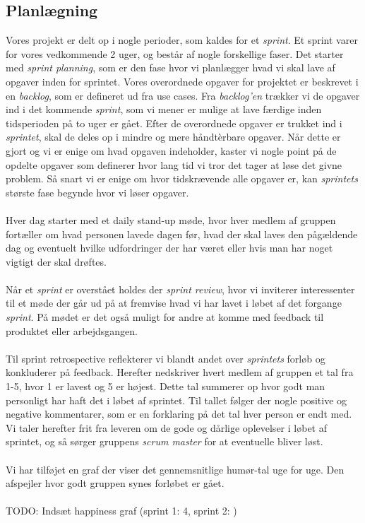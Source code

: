 \subsection{Planlægning}
Vores projekt er delt op i nogle perioder, som kaldes for et \textit{sprint}. Et sprint varer for vores vedkommende 2 uger, og består af nogle forskellige faser.
Det starter med \textit{sprint planning}, som er den fase hvor vi planlægger hvad vi skal lave af opgaver inden for sprintet. Vores overordnede opgaver for projektet er beskrevet i en \textit{backlog}, som er defineret ud fra use cases. Fra \textit{backlog'en} trækker vi de opgaver ind i det kommende \textit{sprint}, som vi mener er mulige at lave færdige inden tidsperioden på to uger er gået. Efter de overordnede opgaver er trukket ind i \textit{sprintet}, skal de deles op i mindre og mere håndtèrbare opgaver. Når dette er gjort og vi er enige om hvad opgaven indeholder, kaster vi nogle point på de opdelte opgaver som definerer hvor lang tid vi tror det tager at løse det givne problem. Så snart vi er enige om hvor tidskrævende alle opgaver er, kan \textit{sprintets} største fase begynde hvor vi løser opgaver.
\\\\
Hver dag starter med et {daily stand-up} møde, hvor hver medlem af gruppen fortæller om hvad personen lavede dagen før, hvad der skal laves den pågældende dag og eventuelt hvilke udfordringer der har været eller hvis man har noget vigtigt der skal drøftes.
\\\\
Når et \textit{sprint} er overstået holdes der \textit{sprint review}, hvor vi inviterer interessenter til et møde der går ud på at fremvise hvad vi har lavet i løbet af det forgange \textit{sprint}. På mødet er det også muligt for andre at komme med feedback til produktet eller arbejdsgangen.
\\\\
Til {sprint retrospective} reflekterer vi blandt andet over \textit{sprintets} forløb og konkluderer på feedback. Herefter nedskriver hvert medlem af gruppen et tal fra 1-5, hvor 1 er lavest og 5 er højest. Dette tal summerer op hvor godt man personligt har haft det i løbet af sprintet. Til tallet følger der nogle positive og negative kommentarer, som er en forklaring på det tal hver person er endt med. Vi taler herefter frit fra leveren om de gode og dårlige oplevelser i løbet af sprintet, og så sørger gruppens \textit{scrum master} for at eventuelle bliver løst.
\\\\
Vi har tilføjet en graf der viser det gennemsnitlige humør-tal uge for uge. Den afspejler hvor godt gruppen synes forløbet er gået.
\\\\
TODO: Indsæt happiness graf (sprint 1: 4, sprint 2: )
